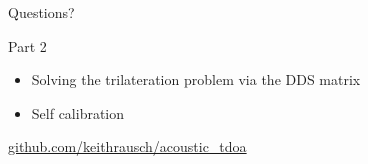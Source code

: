 \documentclass[11pt]{beamer}
\begin{document}
	
	\begin{frame}
		\centering
		\Huge Questions?
	\end{frame}
	
	\begin{frame}{Part 2}
		\begin{itemize}
			\item Solving the trilateration problem via the DDS matrix
			\item Self calibration
		\end{itemize}
	\end{frame}
	
	\begin{frame}
		\centering
		\url{github.com/keithrausch/acoustic_tdoa}
	\end{frame}
	
\end{document}

